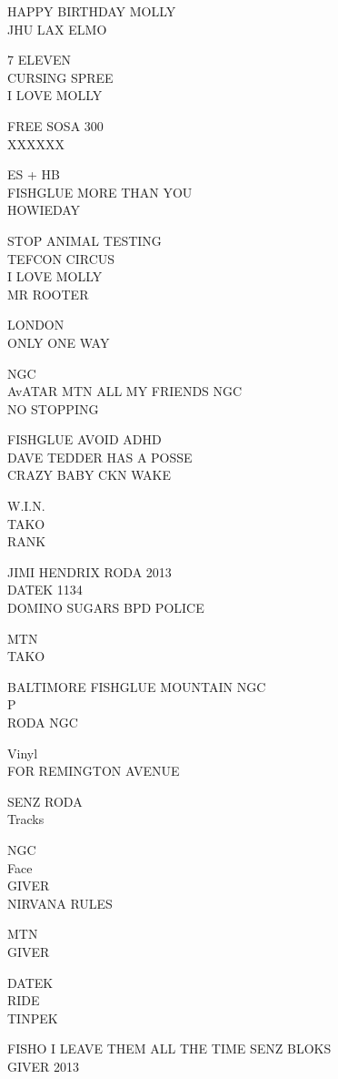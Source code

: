 \documentclass[10pt,letterpaper]{article}
\begin{document}
HAPPY BIRTHDAY MOLLY\\
JHU LAX ELMO

7 ELEVEN\\
CURSING SPREE\\
I LOVE MOLLY

FREE SOSA 300\\
XXXXXX

ES  + HB\\
FISHGLUE MORE THAN YOU\\
HOWIEDAY

STOP ANIMAL TESTING\\
TEFCON CIRCUS\\
I LOVE MOLLY\\
MR ROOTER

LONDON\\
ONLY ONE WAY

NGC\\
AvATAR MTN ALL MY FRIENDS NGC\\
NO STOPPING

FISHGLUE AVOID ADHD\\
DAVE TEDDER HAS A POSSE\\
CRAZY BABY CKN WAKE

W.I.N.\\
TAKO\\
RANK

JIMI HENDRIX RODA 2013\\
DATEK 1134\\
DOMINO SUGARS BPD POLICE

MTN\\
TAKO

BALTIMORE FISHGLUE MOUNTAIN NGC\\
P\\
RODA NGC

Vinyl\\
FOR REMINGTON AVENUE

SENZ RODA\\
Tracks

NGC\\
Face\\
GIVER\\
NIRVANA RULES

MTN\\
GIVER

DATEK\\
RIDE\\
TINPEK

FISHO I LEAVE THEM ALL THE TIME SENZ BLOKS\\
GIVER 2013
\end{document}
